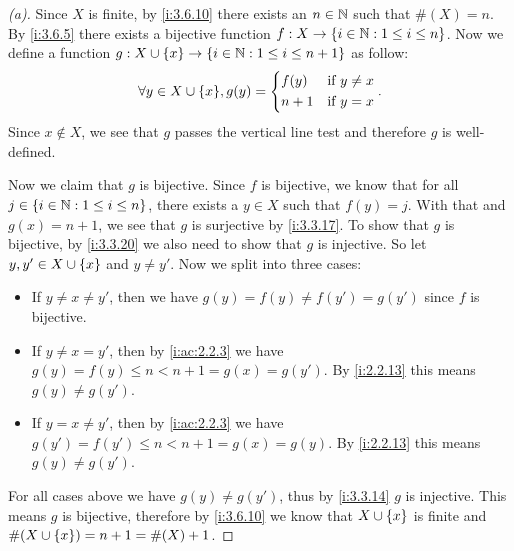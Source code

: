 \begin{proof}[(a)]
  Since \(X\) is finite, by \cref{i:3.6.10} there exists an \(n \in \mathbb{N}\) such that \(\#(X) = n\).
  By \cref{i:3.6.5} there exists a bijective function \(f : X \to \left\lbrace i \in \mathbb{N} : 1 \leq i \leq n\right\rbrace\).
  Now we define a function \(g : X \cup \left\lbrace x\right\rbrace \to \left\lbrace i \in \mathbb{N} : 1 \leq i \leq n + 1\right\rbrace\) as follow:
  \[
    \forall y \in X \cup \set{x}, g(y) = \begin{dcases}
      f(y)  & \text{if } y \neq x \\
      n + 1 & \text{if } y = x
    \end{dcases}.
  \]
  Since \(x \notin X\), we see that \(g\) passes the vertical line test and therefore \(g\) is well-defined.

  Now we claim that \(g\) is bijective.
  Since \(f\) is bijective, we know that for all \(j \in \left\lbrace i \in \mathbb{N} : 1 \leq i \leq n\right\rbrace\), there exists a \(y \in X\) such that \(f(y) = j\).
  With that and \(g(x) = n + 1\), we see that \(g\) is surjective by \cref{i:3.3.17}.
  To show that \(g\) is bijective, by \cref{i:3.3.20} we also need to show that \(g\) is injective.
  So let \(y, y' \in X \cup \left\lbrace x\right\rbrace\) and \(y \neq y'\).
  Now we split into three cases:
  \begin{itemize}
    \item If \(y \neq x \neq y'\), then we have \(g(y) = f(y) \neq f(y') = g(y')\) since \(f\) is bijective.
    \item If \(y \neq x = y'\), then by \cref{i:ac:2.2.3} we have \(g(y) = f(y) \leq n < n + 1 = g(x) = g(y')\).
          By \cref{i:2.2.13} this means \(g(y) \neq g(y')\).
    \item If \(y = x \neq y'\), then by \cref{i:ac:2.2.3} we have \(g(y') = f(y') \leq n < n + 1 = g(x) = g(y)\).
          By \cref{i:2.2.13} this means \(g(y) \neq g(y')\).
  \end{itemize}
  For all cases above we have \(g(y) \neq g(y')\), thus by \cref{i:3.3.14} \(g\) is injective.
  This means \(g\) is bijective, therefore by \cref{i:3.6.10} we know that \(X \cup \left\lbrace x\right\rbrace\) is finite and \(\#(X \cup \left\lbrace x\right\rbrace) = n + 1 = \#(X) + 1\).
\end{proof}

